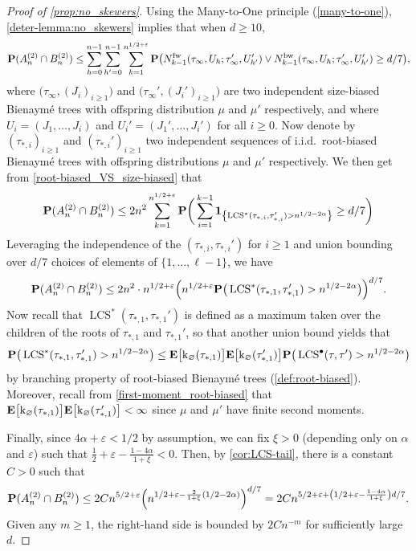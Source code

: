 \documentclass[11pt,reqno]{amsart}
\newcommand{\rk}{\mathrm{k}}
\newcommand{\LCS}{\operatorname{LCS}}
\newcommand{\fw}{\mathrm{fw}}
\newcommand{\bw}{\mathrm{bw}}
\begin{document}
\begin{proof}[Proof of \cref{prop:no_skewers}]
Using the Many-to-One principle (\cref{many-to-one}), \cref{deter-lemma:no_skewers} implies that when $d\geq 10$,
\[
\prob(A_n^{(2)}\cap B_n^{(2)}) \leq \sum_{h=0}^{n-1}\sum_{h'=0}^{n-1}\sum_{k=1}^{n^{1/2+\varepsilon}} \P\big(N_{k-1}^{\fw}(\tau_\infty,U_h; \tau_\infty', U_{h'}') \vee N_{k-1}^{\bw}(\tau_\infty,U_h; \tau_\infty', U_{h'}')\geq d/7 \big),
\]
where $\big(\tau_\infty,(J_i)_{i\geq 1}\big)$ and $\big(\tau_\infty',(J_i')_{i\geq 1}\big)$ are two independent size-biased Bienaym\'{e} trees with offspring distribution $\mu$ and $\mu'$ respectively, and where $U_i = (J_1,\ldots,J_i)$ and $U_i' = (J_1',\ldots,J_i')$ for all $i\geq 0$. Now denote by $(\tau_{*,i})_{i\geq 1}$ and $(\tau_{*,i}')_{i\geq 1}$ two independent sequences of i.i.d.~root-biased Bienaymé trees with offspring distributions $\mu$ and $\mu'$ respectively. We then get from \cref{root-biased_VS_size-biased} that
\[\prob(A_n^{(2)}\cap B_n^{(2)}) \leq 2n^2\sum_{k=1}^{n^{1/2+\varepsilon}}\P\bigg(\sum_{i=1}^{k-1} \I{\LCS^*(\tau_{*,i},\tau_{*,i}')>n^{1/2-2\alpha}}\geq d/7\bigg) \]
Leveraging the independence of the $(\tau_{*,i},\tau_{*,i}')$ for $i\geq 1$ and union bounding over $d/7$ choices of elements of $\{1,\ldots,\ell-1\}$, we have
\[\prob(A_n^{(2)}\cap B_n^{(2)}) \leq 2n^2 \cdot n^{1/2+\varepsilon} \Big(n^{1/2+\varepsilon}\P\big(\LCS^*(\tau_{*,1},\tau_{*,1}')>n^{1/2-2\alpha}\big)\Big)^{d/7}.\]
Now recall that $\LCS^*(\tau_{*,1},\tau_{*,1}')$ is defined as a maximum taken over the children of the roots of $\tau_{*,1}$ and $\tau_{*,1}'$, so that another union bound yields that
\[\P\big(\LCS^*(\tau_{*,1},\tau_{*,1}')>n^{1/2-2\alpha}\big)\leq \E\big[\rk_\varnothing(\tau_{*,1})\big]\E\big[\rk_\varnothing(\tau_{*,1}')\big]\P\big(\LCS^\bullet(\tau,\tau')>n^{1/2-2\alpha}\big)\]
by branching property of root-biased Bienaymé trees (\cref{def:root-biased}). Moreover, recall from \eqref{first-moment_root-biased} that $\E\big[\rk_\varnothing(\tau_{*,1})\big]\E\big[\rk_\varnothing(\tau_{*,1}')\big]<\infty$ since $\mu$ and $\mu'$ have finite second moments.

Finally, since $4\alpha+\varepsilon<1/2$ by assumption, we can fix $\xi>0$ (depending only on $\alpha$ and $\varepsilon$) such that $\tfrac{1}{2}+\varepsilon-\tfrac{1-4\alpha}{1+\xi}<0$. Then, by \cref{cor:LCS-tail}, there is a constant $C > 0$ such that 
\[
\mathbf{P}(A_n^{(2)} \cap B_n^{(2)}) \leq 2C n^{5/2+\varepsilon} \Big(n^{1/2+\varepsilon-\frac{2}{1+\xi}(1/2-2\alpha)} \Big)^{d/7} = 2C n^{5/2+\varepsilon + \left(1/2+\varepsilon -\frac{1-4\alpha}{1+\xi}\right)d/7}.
\]
Given any $m\geq 1$, the right-hand side is bounded by $2Cn^{-m}$ for sufficiently large $d$.
\end{proof}
\end{document}
